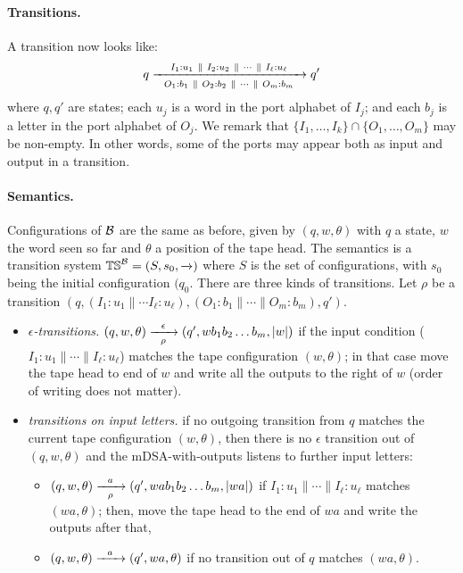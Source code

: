 \paragraph*{Transitions.} A transition now looks like:
\begin{align*}
q \xrightarrow[~~O_1: b_1 ~\parallel~ O_2: b_2 ~\parallel~ \cdots ~\parallel~ O_m: b_m~~]{I_1: u_1 ~\parallel~ I_2: u_2 ~\parallel~ \cdots ~\parallel~ I_\ell: u_\ell} q'
\end{align*}
where $q, q'$ are states; each $u_j$ is a word in the port alphabet of $I_j$; and each $b_j$ is a letter in the port alphabet of $O_j$. We remark that $\{I_1, \dots, I_k\} \cap \{O_1, \dots, O_m\}$ may be non-empty. In other words, some of the ports may appear both as input and output in a transition.  

\paragraph*{Semantics.} Configurations of $\mathcal{B}$ are the same as before, given by $(q, w, \theta)$ with $q$ a state, $w$ the word seen so far and $\theta$ a position of the tape head. The semantics is a transition system $\mathbb{TS}^{\mathcal{B}} = (S, s_0, \xrightarrow{})$ where $S$ is the set of configurations, with $s_0$ being the initial configuration $(q_0$. There are three kinds of transitions. Let $\rho$ be a transition $(q, (I_1: u_1 \parallel \cdots I_\ell:u_\ell), (O_1: b_1 \parallel \cdots \parallel O_m: b_m), q')$.
\begin{itemize}
\item \emph{$\epsilon$-transitions.} $(q, w, \theta) \xrightarrow[\rho]{~~\epsilon~~} (q', wb_1 b_2 \dots b_m, |w|)$ if the input condition ($I_1:u_1 \parallel \cdots \parallel I_\ell:u_\ell$) matches the tape configuration $(w, \theta)$; in that case move the tape head to end of $w$ and write all the outputs to the right of $w$ (order of writing does not matter).
\item \emph{transitions on input letters.} if no outgoing transition from $q$ matches the current tape configuration $(w, \theta)$, then there is no $\epsilon$ transition out of $(q, w, \theta)$ and the mDSA-with-outputs listens to further input letters: 
\begin{itemize}
\item $(q, w, \theta) \xrightarrow[\rho]{~~a~~} (q', wab_1 b_2 \dots b_m, |wa|)$ if $I_1:u_1 \parallel \cdots \parallel I_\ell:u_\ell$ matches $(wa, \theta)$; then, move the tape head to the end of $wa$ and write the outputs after that,
\item $(q, w, \theta) \xrightarrow{~~a~~} (q', wa, \theta)$ if no transition out of $q$ matches $(wa, \theta)$.
\end{itemize}
\end{itemize} 
